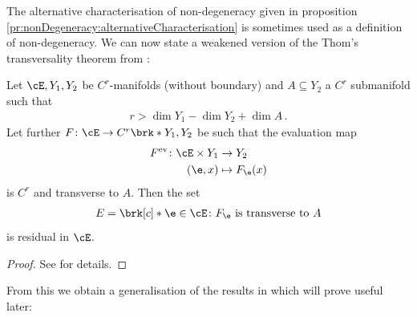 The alternative characterisation of non-degeneracy given in proposition \ref{pr:nonDegeneracy:alternativeCharacterisation}
is sometimes used as a definition of non-degeneracy.
We can now state a weakened version of the Thom's transversality theorem from \cite[Theorem 2.7]{Hirsch1994}:
\begin{theorem}
  Let $\cE,Y_1,Y_2$ be $C^r$-manifolds (without boundary) and $A\subseteq Y_2$ a $C^r$ submanifold such that
  \begin{align*}
    r>\dim Y_1-\dim Y_2+\dim A\,.
  \end{align*}
  Let further $F\colon \cE\to C^r\brk*{Y_1,Y_2}$ be such that the evaluation map
  \begin{align*}
    F^\text{ev}\colon \cE\times Y_1&\to Y_2 \\
    (\e,x)&\mapsto F_\e(x)
  \end{align*}
  is $C^r$ and transverse to $A$.
  Then the set
  \begin{align*}
    E=\brk[c]*{\e\in \cE\colon F_\e\text{ is transverse to } A}
  \end{align*}
  is residual in $\cE$.
\end{theorem}
\begin{proof}
  See \cite[Theorem 2.7]{Hirsch1994} for details.
\end{proof}
From this we obtain
a generalisation of the results in \cite[§2]{Morse1970} which will prove useful later:
